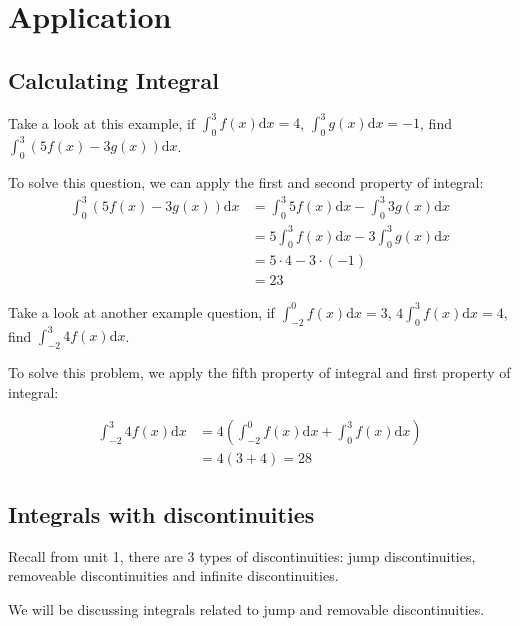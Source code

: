 \documentclass{article}
\begin{document}
\section{Application}
\subsection{Calculating Integral}
Take a look at this example, if 
$\displaystyle \int_{0}^{3} f(x) \mathrm{d}x = 4$, $\displaystyle \int_{0}^{3} g(x) \mathrm{d}x = -1$, find $\displaystyle \int_{0}^{3} \left(5f(x) - 3g(x)\right) \mathrm{d}x$.

To solve this question, we can apply the first and second property of integral:
\begin{align*}
    \int_{0}^{3} \left(5f(x) - 3g(x)\right) \mathrm{d}x &= \int_{0}^{3} 5f(x)\mathrm{d}x - \int_{0}^{3} 3g(x)\mathrm{d}x\\
    &= 5\int_{0}^{3} f(x)\mathrm{d}x - 3\int_{0}^{3}g(x)\mathrm{d}x\\
    &= 5\cdot4 - 3\cdot(-1)\\
    &=23
\end{align*}

Take a look at another example question, if $\displaystyle \int_{-2}^{0} f(x)\mathrm{d}x = 3$, $\displaystyle 4\int_{0}^{3} f(x)\mathrm{d}x = 4$, find $\displaystyle \int_{-2}^{3} 4f(x) \mathrm{d}x$.

To solve this problem, we apply the fifth property of integral and first property of integral:

\begin{align*}
    \int_{-2}^{3} 4f(x)\mathrm{d}x &= 4\left(\int_{-2}^{0} f(x)\mathrm{d}x + \int_{0}^{3} f(x) \mathrm{d}x\right)\\
    &= 4(3+4) = 28
\end{align*}

\subsection{Integrals with discontinuities}
Recall from unit 1, there are 3 types of discontinuities: jump discontinuities, removeable discontinuities and infinite discontinuities. 

We will be discussing integrals related to jump and removable discontinuities.
\end{document}
